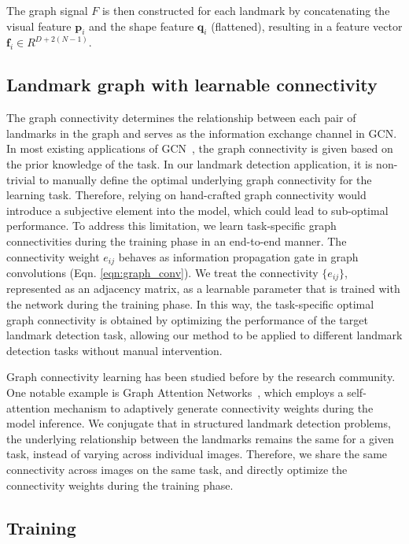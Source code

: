 \documentclass[runningheads]{llncs}
\begin{document}
The graph signal $F$ is then constructed for each landmark by concatenating the visual feature $\mathbf{p}_i$ and the shape feature $\mathbf{q}_i$ (flattened), resulting in a feature vector $\mathbf{f}_i \in R^{D + 2(N-1)}$.

\subsection{Landmark graph with learnable connectivity}
\label{subsec:graphadj}

The graph connectivity determines the relationship between each pair of landmarks in the graph and serves as the information exchange channel in GCN. In most existing applications of GCN~\cite{qi2019attentive,ling2019fast,zhao2019semantic,velivckovic2017graph,wu2019session}, the graph connectivity is given based on the prior knowledge of the task. In our landmark detection application, it is non-trivial to manually define the optimal underlying graph connectivity for the learning task. 
Therefore, relying on hand-crafted graph connectivity would introduce a subjective element into the model, which could lead to sub-optimal performance. To address this limitation, we learn task-specific graph connectivities during the training phase in an end-to-end manner. The connectivity weight $e_{ij}$ behaves as information propagation gate in graph convolutions (Eqn. \ref{eqn:graph_conv}). We treat the connectivity $\{e_{ij}\}$, represented as an adjacency matrix, as a learnable parameter that is trained with the network during the training phase. In this way, the task-specific optimal graph connectivity is obtained by optimizing the performance of the target landmark detection task, allowing our method to be applied to different landmark detection tasks without manual intervention.

Graph connectivity learning has been studied before by the research community. One notable example is Graph Attention Networks~\cite{velivckovic2017graph}, which employs a self-attention mechanism to adaptively generate connectivity weights during the model inference. We conjugate that in structured landmark detection problems, the underlying relationship between the landmarks remains the same for a given task, instead of varying across individual images. Therefore, we share the same connectivity across images on the same task, and directly optimize the connectivity weights during the training phase.

\subsection{Training}
\label{subsec:training}
\end{document}
